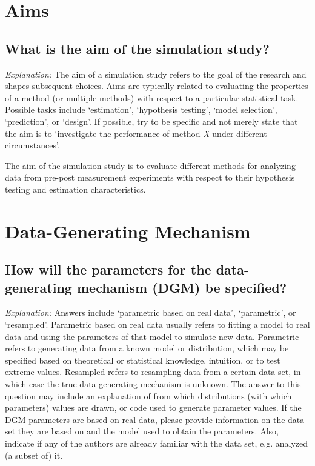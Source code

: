 \documentclass[12pt]{article}
\begin{document}
\section{Aims}
\subsection{What is the aim of the simulation study?}

\textit{Explanation:} The aim of a simulation study refers to the goal of the research and shapes subsequent choices. Aims are typically related to evaluating the properties of a method (or multiple methods) with respect to a particular statistical task. Possible tasks include `estimation', `hypothesis testing', `model selection', `prediction', or `design'. If possible, try to be specific and not merely state that the aim is to `investigate the performance of method \textit{X} under different circumstances'.

\begin{examplebox}
The aim of the simulation study is to evaluate different methods for analyzing data from pre-post measurement experiments with respect to their hypothesis testing and estimation characteristics.
\end{examplebox}


\section{Data-Generating Mechanism}
\subsection{How will the parameters for the data-generating mechanism (DGM) be specified?}
\textit{Explanation:} Answers include `parametric based on real data', `parametric', or `resampled'. Parametric based on real data usually refers to fitting a model to real data and using the parameters of that model to simulate new data. Parametric refers to generating data from a known model or distribution, which may be specified based on theoretical or statistical knowledge, intuition, or to test extreme values. Resampled refers to resampling data from a certain data set, in which case the true data-generating mechanism is unknown. The answer to this question may include an explanation of from which distributions (with which parameters) values are drawn, or code used to generate parameter values. If the DGM parameters are based on real data, please provide information on the data set they are based on and the model used to obtain the parameters. Also, indicate if any of the authors are already familiar with the data set, e.g. analyzed (a subset of) it.
\end{document}
